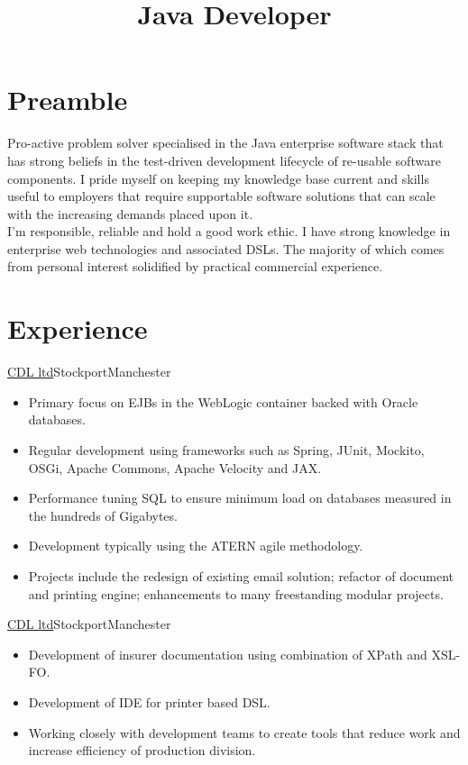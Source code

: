 \documentclass[a4paper,11pt]{moderncv}
\title{Java Developer}
\newcommand\weblink[2] {{\color{href} \href{#1}{#2}}}
\begin{document}
\maketitle

\section{Preamble}
Pro-active problem solver specialised in the Java enterprise software stack that has strong beliefs in the test-driven development lifecycle of re-usable software components.
I pride myself on keeping my knowledge base current and skills useful to employers that require supportable software solutions that can scale with the increasing demands placed upon it.\\

I'm responsible, reliable and hold a good work ethic. 
I have strong knowledge in enterprise web technologies and associated DSLs. The majority of which comes from personal interest solidified by practical commercial experience.

\section{Experience}

{\weblink{http://www.cdl.co.uk}{CDL ltd}}{Stockport}{Manchester}{
\begin{itemize}
  \item Primary focus on EJBs in the WebLogic container backed with Oracle databases.
  \item Regular development using frameworks such as Spring, JUnit, Mockito, OSGi, Apache Commons, Apache Velocity and JAX.
  \item Performance tuning SQL to ensure minimum load on databases measured in the hundreds of Gigabytes.
  \item Development typically using the ATERN agile methodology.
  \item Projects include the redesign of existing email solution; refactor of document and printing engine; enhancements to many freestanding modular projects.
\end{itemize}
}

{\weblink{http://www.cdl.co.uk}{CDL ltd}}{Stockport}{Manchester}{
\begin{itemize}
  \item Development of insurer documentation using combination of XPath and XSL-FO.
  \item Development of IDE for printer based DSL.
  \item Working closely with development teams to create tools that reduce work and increase efficiency of production division.
\end{itemize}
}
\end{document}
